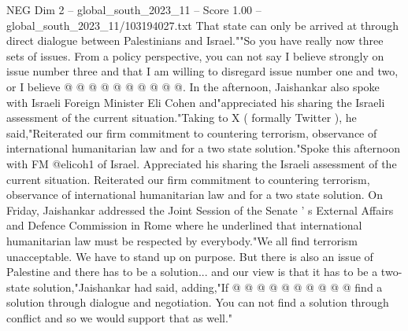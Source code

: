 \begin{textsample}{NEG Dim 2 – global\_south\_2023\_11 – Score 1.00 – global\_south\_2023\_11/103194027.txt}
That state can only be arrived at through direct dialogue between Palestinians and Israel.""So you have really now three sets of issues.
From a policy perspective, you can not say I believe strongly on issue number three and that I am willing to disregard issue number one and two, or I believe @ @ @ @ @ @ @ @ @ @.
In the afternoon, Jaishankar also spoke with Israeli Foreign Minister Eli Cohen and"appreciated his sharing the Israeli assessment of the current situation."Taking to X ( formally Twitter ), he said,"Reiterated our firm commitment to countering terrorism, observance of international humanitarian law and for a two state solution."Spoke this afternoon with FM @elicoh1 of Israel.
Appreciated his sharing the Israeli assessment of the current situation.
Reiterated our firm commitment to countering terrorism, observance of international humanitarian law and for a two state solution.
On Friday, Jaishankar addressed the Joint Session of the Senate ' s External Affairs and Defence Commission in Rome where he underlined that international humanitarian law must be respected by everybody."We all find terrorism unacceptable.
We have to stand up on purpose.
But there is also an issue of Palestine and there has to be a solution... and our view is that it has to be a two-state solution,"Jaishankar had said, adding,"If @ @ @ @ @ @ @ @ @ @ find a solution through dialogue and negotiation.
You can not find a solution through conflict and so we would support that as well."

\end{textsample}
